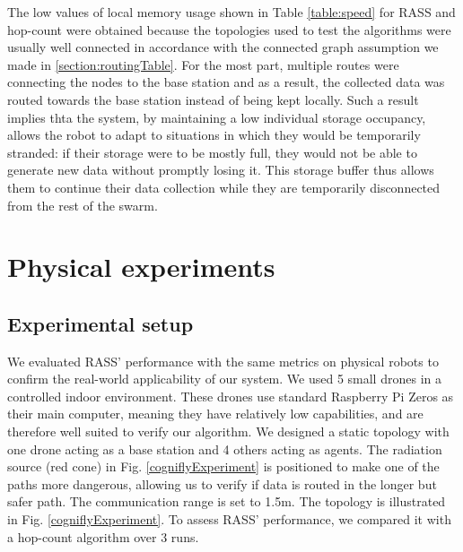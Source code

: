 \documentclass[sigconf]{aamas}
\begin{document}
The low values of local memory usage shown in Table \ref{table:speed} for RASS and hop-count were obtained because the topologies used to test the algorithms were usually well connected in accordance with the connected graph assumption we made in \ref{section:routingTable}. For the most part, multiple routes were connecting the nodes to the base station and as a result, the collected data was routed towards the base station instead of being kept locally. Such a result implies thta the system, by maintaining a low individual storage occupancy, allows the robot to adapt to situations in which they would be temporarily stranded: if their storage were to be mostly full, they would not be able to generate new data without promptly losing it. This storage buffer thus allows them to continue their data collection while they are temporarily disconnected from the rest of the swarm.

\section{Physical experiments}
\label{Physical experiments}

\subsection{Experimental setup}
We evaluated RASS' performance with the same
metrics on physical robots to confirm the real-world applicability of our system. We used 5 small drones in a controlled indoor environment. These drones use standard Raspberry Pi Zeros as their main computer, meaning they have relatively low capabilities, and are therefore well suited to verify our algorithm. We designed a static topology with one drone acting as a base station and 4 others acting as agents. The radiation source (red cone) in Fig. \ref{cogniflyExperiment} is positioned to make one of the paths more dangerous, allowing us to verify if data is routed in the longer but safer path. The communication range is set to 1.5m. The topology is illustrated in Fig. \ref{cogniflyExperiment}. To assess RASS' performance, we compared it with a hop-count algorithm over 3 runs.
\end{document}
